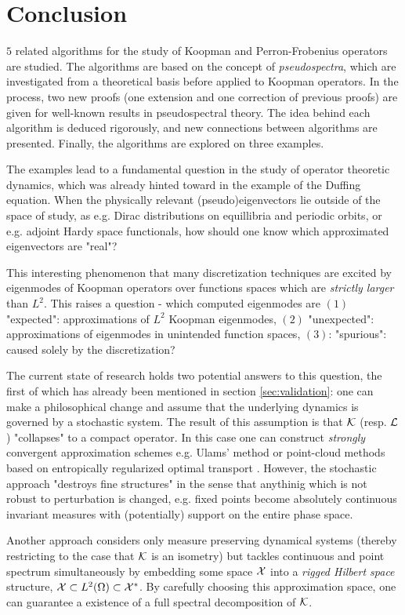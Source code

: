 
\section{Conclusion}

$5$ related algorithms for the study of Koopman and Perron-Frobenius operators are studied. 
The algorithms are based on the concept of \emph{pseudospectra}, which are investigated 
from a theoretical basis before applied to Koopman operators. In the process, two new 
proofs (one extension and one correction of previous proofs) are given for well-known 
results in pseudospectral theory. The idea behind each algorithm is deduced rigorously, 
and new connections between algorithms are presented. Finally, the algorithms are explored 
on three examples. 

The examples lead to a fundamental question in the study of operator theoretic dynamics, 
which was already hinted toward in the example of the Duffing equation. When the 
physically relevant (pseudo)eigenvectors lie outside of the space of study, as e.g. Dirac 
distributions on equillibria and periodic orbits, or e.g. adjoint Hardy space functionals, 
how should one know which approximated eigenvectors are "real"? 

This interesting phenomenon that many discretization techniques are excited by eigenmodes of 
Koopman operators over functions spaces which are \emph{strictly larger} than $L^2$. 
This raises a question - which computed eigenmodes are $(1)$ "expected": 
approximations of $L^2$ Koopman eigenmodes, $(2)$ "unexpected": approximations of 
eigenmodes in unintended function spaces, $(3)$: "spurious": caused solely by the 
discretization?

The current state of research holds two potential answers to this question, the first of 
which has already been mentioned in section \ref{sec:validation}: one can make a 
philosophical change and assume that the underlying dynamics is governed by a 
stochastic system. The result of this assumption is that $\mathcal{K}$ (resp. $\mathcal{L}$) 
"collapses" to a compact operator. In this case one can construct \emph{strongly} 
convergent approximation schemes e.g. Ulams' method \cite{attr} or point-cloud methods 
based on entropically regularized optimal transport \cite{entropic}. However, the 
stochastic approach "destroys fine structures" in the sense that anythinig which is 
not robust to perturbation is changed, e.g. fixed points become absolutely continuous 
invariant measures with (potentially) support on the entire phase space. 

Another approach \cite{rigged} considers only measure preserving dynamical systems 
(thereby restricting to the case that $\mathcal{K}$ is an isometry) but tackles continuous and 
point spectrum simultaneously by embedding some space $\mathcal{X}$ into a \emph{rigged Hilbert 
space} structure, $\mathcal{X} \subset L^2 (\Omega) \subset \mathcal{X}^*$. By carefully choosing this 
approximation space, one can guarantee a existence of a full spectral decomposition of 
$\mathcal{K}$. 


